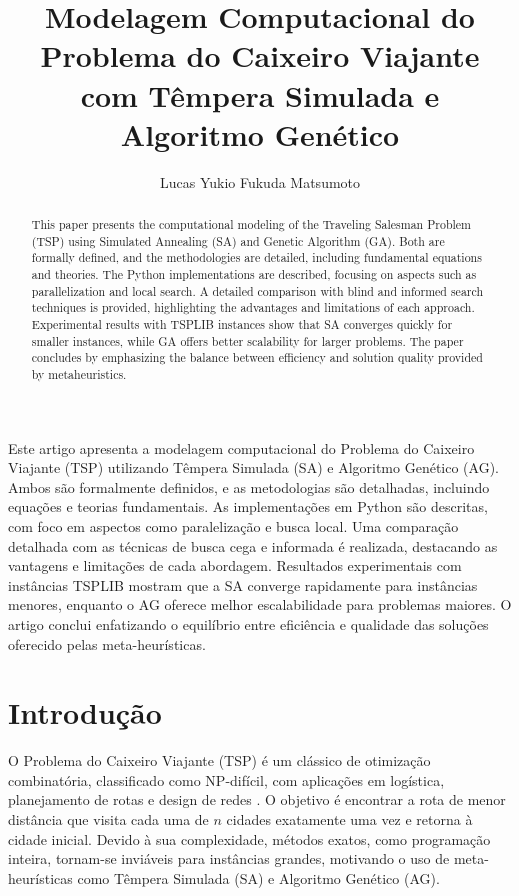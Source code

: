 \documentclass[11pt]{article}
\title{Modelagem Computacional do Problema do Caixeiro Viajante com Têmpera Simulada e Algoritmo Genético}
\author{Lucas Yukio Fukuda Matsumoto\inst{1}}
\begin{document}
\fontsize{11pt}{11pt}\selectfont
\maketitle

\begin{resumo}
Este artigo apresenta a modelagem computacional do Problema do Caixeiro Viajante (TSP) utilizando Têmpera Simulada (SA) e Algoritmo Genético (AG). Ambos são formalmente definidos, e as metodologias são detalhadas, incluindo equações e teorias fundamentais. As implementações em Python são descritas, com foco em aspectos como paralelização e busca local. Uma comparação detalhada com as técnicas de busca cega e informada é realizada, destacando as vantagens e limitações de cada abordagem. Resultados experimentais com instâncias TSPLIB mostram que a SA converge rapidamente para instâncias menores, enquanto o AG oferece melhor escalabilidade para problemas maiores. O artigo conclui enfatizando o equilíbrio entre eficiência e qualidade das soluções oferecido pelas meta-heurísticas.
\end{resumo}

\begin{abstract}
This paper presents the computational modeling of the Traveling Salesman Problem (TSP) using Simulated Annealing (SA) and Genetic Algorithm (GA). Both are formally defined, and the methodologies are detailed, including fundamental equations and theories. The Python implementations are described, focusing on aspects such as parallelization and local search. A detailed comparison with blind and informed search techniques is provided, highlighting the advantages and limitations of each approach. Experimental results with TSPLIB instances show that SA converges quickly for smaller instances, while GA offers better scalability for larger problems. The paper concludes by emphasizing the balance between efficiency and solution quality provided by metaheuristics.
\end{abstract}

\section{Introdução}
O Problema do Caixeiro Viajante (TSP) é um clássico de otimização combinatória, classificado como NP-difícil, com aplicações em logística, planejamento de rotas e design de redes \cite{applegate2006}. O objetivo é encontrar a rota de menor distância que visita cada uma de \(n\) cidades exatamente uma vez e retorna à cidade inicial. Devido à sua complexidade, métodos exatos, como programação inteira, tornam-se inviáveis para instâncias grandes, motivando o uso de meta-heurísticas como Têmpera Simulada (SA) e Algoritmo Genético (AG).
\end{document}
